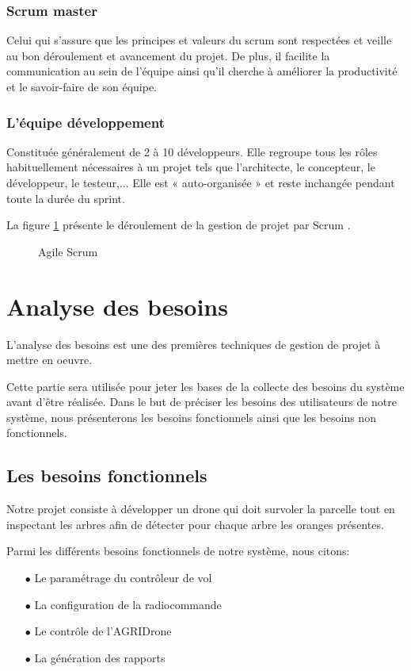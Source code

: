 \subsubsection{Scrum master  }
Celui qui s’assure que les principes et valeurs du scrum sont
respectées et veille au bon déroulement et avancement du projet. De plus, il facilite la communication au sein de l’équipe ainsi qu'il cherche à améliorer la productivité et le savoir-faire de son équipe.
\subsubsection{L'équipe développement  }
Constituée généralement de 2 à 10 développeurs. Elle regroupe tous les rôles habituellement nécessaires à un projet tels que l'architecte, le concepteur, le développeur, le testeur,... Elle est « auto-organisée » et reste inchangée pendant toute la durée du sprint.

La figure \ref{fig:A.S} présente le déroulement de la gestion de projet par Scrum \cite{Crochet}.
\begin{figure} [H]
	\begin{center}
		\centering
		\vskip 1.5cm
		\hspace*{-0.5cm}
	\end{center}
	\caption{\label{fig:A.S}Agile Scrum}
\end{figure}
\section{Analyse des besoins }	
L'analyse des besoins est une des premières techniques de gestion de projet à mettre en oeuvre.

Cette partie sera utilisée pour jeter les bases de la collecte des besoins du système avant d'être réalisée.
Dans le but de préciser les besoins des utilisateurs de notre système, nous présenterons les besoins fonctionnels ainsi que les besoins non fonctionnels.

\subsection{Les besoins fonctionnels}
Notre projet consiste à développer un drone qui doit survoler la parcelle tout en inspectant les arbres afin de détecter pour chaque arbre les oranges présentes.

Parmi les différents besoins fonctionnels de notre système, nous citons:
\begin{itemize}
	\item [$\bullet$] Le paramétrage du contrôleur de vol 
	\item [$\bullet$]La configuration de la radiocommande 
	\item [$\bullet$]Le contrôle de l'AGRIDrone
	\item[$\bullet$] La génération des rapports
\end{itemize} 

